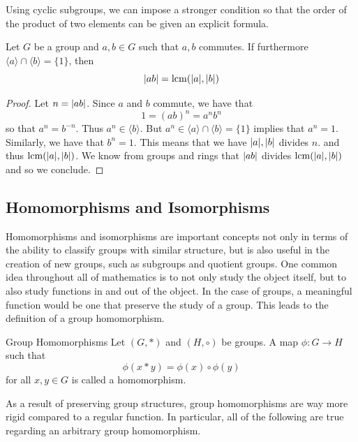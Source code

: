 \documentclass[a4paper]{article}
\begin{document}
Using cyclic subgroups, we can impose a stronger condition so that the order of the product of two elements can be given an explicit formula. 

\begin{prp}{}{} Let $G$ be a group and $a,b\in G$ such that $a,b$ commutes. If furthermore $\langle a\rangle\cap\langle b\rangle=\{1\}$, then $$\abs{ab}=\operatorname{lcm}(\abs{a},\abs{b})$$ \tcbline
\begin{proof}
Let $n=\abs{ab}$. Since $a$ and $b$ commute, we have that $$1=(ab)^n=a^nb^n$$ so that $a^n=b^{-n}$. Thus $a^n\in\langle b\rangle$. But $a^n\in\langle a\rangle\cap\langle b\rangle=\{1\}$ implies that $a^n=1$. Similarly, we have that $b^n=1$. This means that we have $\abs{a},\abs{b}$ divides $n$. and thus $\operatorname{lcm}(\abs{a},\abs{b})$. We know from groups and rings that $\abs{ab}$ divides $\operatorname{lcm}(\abs{a},\abs{b})$ and so we conclude. 
\end{proof}
\end{prp}

\subsection{Homomorphisms and Isomorphisms}
Homomorphisms and isomorphisms are important concepts not only in terms of the ability to classify groups with similar structure, but is also useful in the creation of new groups, such as subgroups and quotient groups. One common idea throughout all of mathematics is to not only study the object itself, but to also study functions in and out of the object. In the case of groups, a meaningful function would be one that preserve the study of a group. This leads to the definition of a group homomorphism. 

\begin{defn}{Group Homomorphisms}{} Let $(G,*)$ and $(H,\circ)$ be groups. A map $\phi:G\to H$ such that $$\phi(x*y)=\phi(x)\circ\phi(y)$$ for all $x,y\in G$ is called a homomorphism. 
\end{defn}

As a result of preserving group structures, group homomorphisms are way more rigid compared to a regular function. In particular, all of the following are true regarding an arbitrary group homomorphism. 
\end{document}
